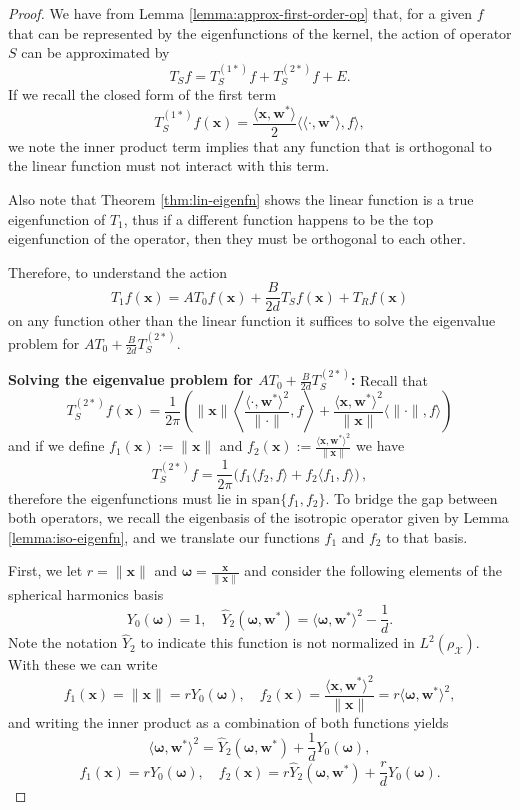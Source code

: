 \begin{proof}

    We have from Lemma \ref{lemma:approx-first-order-op} that, for a given $f$ that can be represented by the eigenfunctions of the kernel, the action of operator $S$ can be approximated by
    \[
        T_Sf = T_S^{{(1*)}}f + T_S^{{(2*)}}f + E.
    \]
    If we recall the closed form of the first term
    \[
        T_S^{{(1*)}}f(\bm x) = \frac{\langle \bm x, \bm w^*\rangle}{2}\langle\langle \cdot, \bm w^*\rangle,f\rangle, 
    \]
    we note the inner product term implies that any function that is orthogonal to the linear function must not interact with this term. 
    
    Also note that Theorem \ref{thm:lin-eigenfn} shows the linear function is a true eigenfunction of $T_1$, thus if a different function happens to be the top eigenfunction of the operator, then they must be orthogonal to each other. 
    
    Therefore, to understand the action
    \[
        T_1 f(\bm x) = AT_0f(\bm x) + \frac{B}{2d}T_S f(\bm x) + T_Rf(\bm x)
    \]
    on any function other than the linear function it suffices to solve the eigenvalue problem for $AT_0 + \frac{B}{2d}T_{S}^{(2*)}$.

    {\bf Solving the eigenvalue problem for $AT_0 + \frac{B}{2d}T_{S}^{(2*)}$:}
    Recall that
    \[
        T_{S}^{(2*)}f (\bm x) = \frac{1}{2\pi}\left( \|\bm x \| \left\langle \frac{\langle \cdot, \bm w^*\rangle^2}{\|\cdot\|}, f \right\rangle + \frac{\langle \bm x, \bm w^*\rangle^2}{\|\bm x\|} \langle \|\cdot\|, f\rangle \right)
    \]
    and if we define $f_1(\bm x) := \|\bm x\|$ and $f_2(\bm x) := \frac{\langle \bm x, \bm w^*\rangle^2}{\|\bm x\|}$ we have
    \[
        T_{S}^{(2*)}f = \frac{1}{2\pi}\Big( f_1\langle f_2, f\rangle + f_2 \langle f_1, f\rangle\Big)\, ,
    \]
    therefore the eigenfunctions must lie in $\text{span}\{f_1, f_2\}$. To bridge the gap between both operators, we recall the eigenbasis of the isotropic operator given by Lemma \ref{lemma:iso-eigenfn}, and we translate our functions $f_1$ and $f_2$ to that basis.
        
    First, we let $r = \|\bm x\|$ and $\bm \omega = \frac{\bm x}{\|\bm x\|}$ and consider the following elements of the spherical harmonics basis
    \[
        Y_0(\bm \omega) = 1, \quad \hat{Y}_2(\bm \omega, \bm w^*) = \langle \bm \omega, \bm w^*\rangle^2 - \frac{1}{d}.
    \]
    Note the notation $\hat{Y}_2$ to indicate this function is not normalized in $L^2(\rho_{\mathcal X})$.
    With these we can write
    \[
        f_1(\bm x) = \|\bm x\| = r Y_0(\bm \omega), \quad f_2(\bm x) = \frac{\langle \bm x, \bm w^*\rangle^2}{\|\bm x\|} = r\langle \bm \omega, \bm w^*\rangle^2,
    \]
    and writing the inner product as a combination of both functions yields
    \[
        \langle \bm \omega, \bm w^*\rangle^2 = \hat{Y}_2(\bm \omega, \bm w^*) + \frac{1}{d}Y_0(\bm \omega),
    \]
    \[
        f_1(\bm x) = r Y_0(\bm \omega), \quad f_2(\bm x) = r \hat{Y}_2(\bm \omega, \bm w^*) + \frac{r}{d} Y_0(\bm \omega).
    \]
    

\end{proof}
